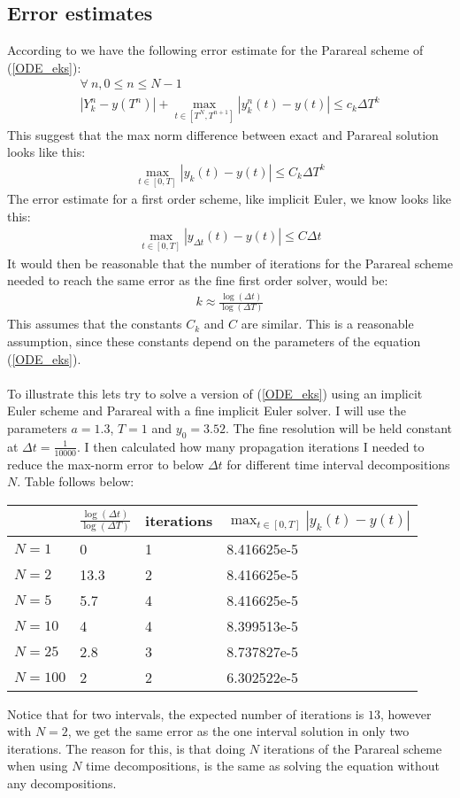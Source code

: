 \subsection{Error estimates}
According to \cite{lions2001resolution} we have the following error estimate for the Parareal scheme of (\ref{ODE_eks}):
\begin{gather*}
\forall \ n,0\leq n\leq N-1 \\ |Y_k^n-y(T^n)| + \max_{t\in[T^N,T^{n+1}]}|y_k^n(t)-y(t)| \leq c_k\Delta T^k
\end{gather*} 
This suggest that the max norm difference between exact and Parareal solution looks like this:
\begin{align*}
\max_{t\in[0,T]}|y_k(t)-y(t)| \leq C_k\Delta T^k
\end{align*}
The error estimate for a first order scheme, like implicit Euler, we know looks like this:
\begin{align*}
\max_{t\in[0,T]}|y_{\Delta t}(t)-y(t)| \leq C\Delta t
\end{align*}
It would then be reasonable that the number of iterations for the Parareal scheme needed to reach the same error as the fine first order solver, would be:
\begin{align*}
k\approx\frac{\log(\Delta t)}{\log(\Delta T)}
\end{align*}
This assumes that the constants $C_k$ and $C$ are similar. This is a reasonable assumption, since these constants depend on the parameters of the equation (\ref{ODE_eks}). 
\\
\\
To illustrate this lets try to solve a version of (\ref{ODE_eks}) using an implicit Euler scheme and Parareal with a fine implicit Euler solver. I will use  the parameters $a=1.3$, $T=1$ and $y_0= 3.52$. The fine resolution will be held constant at $\Delta t=\frac{1}{10000}$. I then calculated how many propagation iterations I needed to reduce the max-norm error to below $\Delta t$ for different time interval decompositions $N$. Table follows below:
 \begin{center}
    \begin{tabular}{| l | l | l | l |}
    \hline
     & $\frac{\log(\Delta t)}{\log(\Delta T)}$&iterations  & $\max_{t\in[0,T]}|y_k(t)-y(t)|$   \\ \hline
    $N=1$ &0 & 1& 8.416625e-5 	\\ \hline
    $N=2$ &13.3 &2& 8.416625e-5 	\\ \hline
    $N=5$ &5.7&4& 8.416625e-5	\\ \hline
    $N=10$ &4&4& 8.399513e-5	\\ \hline
    $N=25$ &2.8&3& 	8.737827e-5\\ \hline
    $N=100$ &2&2&	6.302522e-5\\ \hline
    \end{tabular}
\end{center}
Notice that for two intervals, the expected number of iterations is $13$, however with $N=2$, we get the same error as the one interval solution in only two iterations. The reason for this, is that doing $N$ iterations of the Parareal scheme when using $N$ time decompositions, is the same as solving the equation without any decompositions. 
